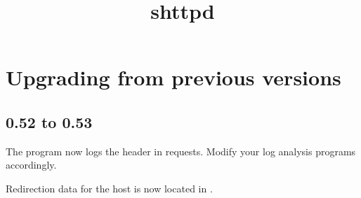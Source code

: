 \documentclass{book}
\title{shttpd}
\begin{document}
\section{Upgrading from previous versions}

\subsection{0.52 to 0.53}
The  program now logs the  header in requests.
Modify your log analysis programs accordingly.

Redirection data for the host  is now located in
.
\end{document}
